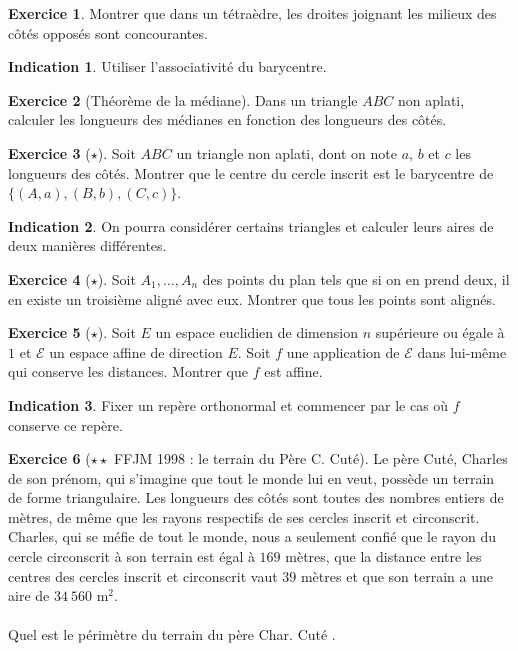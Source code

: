 \documentclass[french]{book}
\theoremstyle{definition}
\newtheorem{ex}{Exercice}[chapter]
\theoremstyle{theorem}
\newtheorem*{ind}{Indication}
\theoremstyle{remark}
\begin{document}
\begin{ex}
	Montrer que dans un tétraèdre, les droites joignant les milieux des côtés opposés sont concourantes.
\end{ex}

\begin{ind}
	Utiliser l'associativité du barycentre.
\end{ind}

\begin{ex}[Théorème de la médiane]
	Dans un triangle $ABC$ non aplati, calculer les longueurs des médianes en fonction des longueurs des côtés.
\end{ex}

\begin{ex}[$\star$]
	Soit $ABC$ un triangle non aplati, dont on note $a$, $b$ et $c$ les longueurs des côtés. Montrer que le centre du cercle inscrit est le barycentre de $\{(A,a),(B,b),(C,c)\}$.
\end{ex}

\begin{ind}
	On pourra considérer certains triangles et calculer leurs aires de deux manières différentes.
\end{ind}

\begin{ex}[$\star$]
	Soit $A_1,\ldots,A_n$ des points du plan tels que si on en prend deux, il en existe un troisième aligné avec eux. Montrer que tous les points sont alignés.
\end{ex}

\begin{ex}[$\star$]
	Soit $E$ un espace euclidien de dimension $n$ supérieure ou égale à $1$ et $\mathcal{E}$ un espace affine de direction $E$. Soit $f$ une application de $\mathcal{E}$ dans lui-même qui conserve les distances. Montrer que $f$ est affine.
\end{ex}

\begin{ind}
	Fixer un repère orthonormal et commencer par le cas où $f$ conserve ce repère.
\end{ind}

\begin{ex}[$\star\star$ FFJM 1998 : le terrain du Père C. Cuté]
	Le père Cuté, Charles de son prénom, qui s'imagine que tout le monde lui en veut, possède un terrain de forme triangulaire. Les longueurs des côtés sont toutes des nombres entiers de mètres, de même que les rayons respectifs de ses cercles inscrit et circonscrit. Charles, qui se méfie de tout le monde, nous a seulement confié que le rayon du cercle circonscrit à son terrain est égal à $169$ mètres, que la distance entre les centres des cercles inscrit et circonscrit vaut $39$ mètres et que son terrain a une aire de $34\ 560$ m$^2$. \\ \\ Quel est le périmètre du terrain du père Char. Cuté .
\end{ex}
\end{document}
